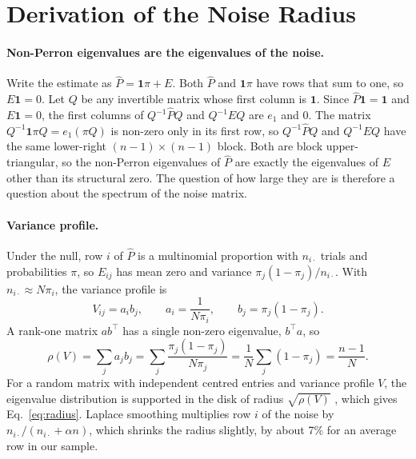 \documentclass[11pt]{article}
\begin{document}
\clearpage
\section{Derivation of the Noise Radius}
\label{app:radius}

\paragraph{Non-Perron eigenvalues are the eigenvalues of the noise.} Write the estimate as $\hat P = \mathbf 1\pi + E$. Both $\hat P$ and $\mathbf 1\pi$ have rows that sum to one, so $E\mathbf 1 = 0$. Let $Q$ be any invertible matrix whose first column is $\mathbf 1$. Since $\hat P\mathbf 1 = \mathbf 1$ and $E\mathbf 1 = 0$, the first columns of $Q^{-1}\hat P Q$ and $Q^{-1}EQ$ are $e_1$ and $0$. The matrix $Q^{-1}\mathbf 1\pi Q = e_1(\pi Q)$ is non-zero only in its first row, so $Q^{-1}\hat PQ$ and $Q^{-1}EQ$ have the same lower-right $(n-1)\times(n-1)$ block. Both are block upper-triangular, so the non-Perron eigenvalues of $\hat P$ are exactly the eigenvalues of $E$ other than its structural zero. The question of how large they are is therefore a question about the spectrum of the noise matrix.

\paragraph{Variance profile.} Under the null, row $i$ of $\hat P$ is a multinomial proportion with $n_{i\cdot}$ trials and probabilities $\pi$, so $E_{ij}$ has mean zero and variance $\pi_j(1-\pi_j)/n_{i\cdot}$. With $n_{i\cdot} \approx N\pi_i$, the variance profile is
\begin{equation*}
V_{ij} = a_i b_j, \qquad a_i = \frac{1}{N\pi_i}, \qquad b_j = \pi_j(1-\pi_j).
\end{equation*}
A rank-one matrix $ab^\top$ has a single non-zero eigenvalue, $b^\top a$, so
\begin{equation*}
\rho(V) = \sum_j a_j b_j = \sum_j \frac{\pi_j(1-\pi_j)}{N\pi_j} = \frac1N \sum_j (1-\pi_j) = \frac{n-1}{N}.
\end{equation*}
For a random matrix with independent centred entries and variance profile $V$, the eigenvalue distribution is supported in the disk of radius $\sqrt{\rho(V)}$ \cite[Theorem~2.3]{cooketal2018}, which gives Eq.~\eqref{eq:radius}. Laplace smoothing multiplies row $i$ of the noise by $n_{i\cdot}/(n_{i\cdot} + \alpha n)$, which shrinks the radius slightly, by about 7\% for an average row in our sample.
\end{document}
